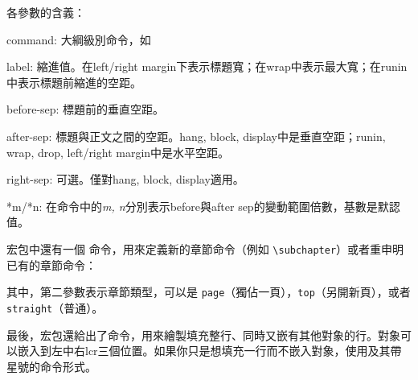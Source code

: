 各參數的含義：
\begin{para}
\item[command:] 大綱級別命令，如
\item[label:] 縮進值。在left/right margin下表示標題寬；在wrap中表示最大寬；在runin中表示標題前縮進的空距。
\item[before-sep:] 標題前的垂直空距。
\item[after-sep:] 標題與正文之間的空距。hang, block, display中是垂直空距；runin, wrap, drop, left/right margin中是水平空距。
\item[right-sep:] 可選。僅對hang, block, display適用。
\item[*m/*n:] 在命令中的\textit{m, n}分別表示before與after sep的變動範圍倍數，基數是默認值。
\end{para}

宏包中還有一個  命令，用來定義新的章節命令（例如 \verb|\subchapter|）或者重申明已有的章節命令：
其中，第二參數表示章節類型，可以是 \texttt{page}（獨佔一頁），\texttt{top}（另開新頁），或者 \texttt{straight}（普通）。

最後，宏包還給出了命令，用來繪製填充整行、同時又嵌有其他對象的行。對象可以嵌入到左中右lcr三個位置。如果你只是想填充一行而不嵌入對象，使用及其帶星號的命令形式。
\begin{latex}
\end{latex}

